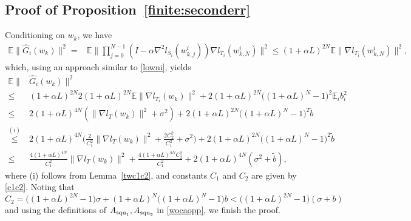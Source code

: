 \documentclass{osudissert96}
\begin{document}
\subsection*{Proof of Proposition~\ref{finite:seconderr}}
	Conditioning on $w_k$, we have 
	\begin{align*}
	\mathbb{E}\|\widehat G_i(w_k)\|^2 = &\mathbb{E} \Big\| \prod_{j=0}^{N-1}(I - \alpha \nabla^2 l_{S_i}(w_{k,j}^i))\nabla l_{T_i}(w_{k,N}^i)  \Big\|^2 \leq  (1+\alpha L)^{2N} \mathbb{E} \|\nabla l_{T_i}(w_{k,N}^i)\|^2,
	\end{align*}
	which, using an approach similar to \cref{lowni}, yields
	\begin{align}\label{gwkopo}
	\mathbb{E}\|&\widehat G_i(w_k)\|^2\nonumber
	\\ \leq&  (1+\alpha L)^{2N} 2(1+\alpha L)^{2N} \mathbb{E} \|\nabla l_{T_i}(w_k)\|^2 + 2(1+\alpha L)^{2N} \big( (1+\alpha L)^N -1\big)^2 \mathbb{E}_i b_i^2 \nonumber
	\\ \leq  & 2(1+\alpha L)^{4N} (\|\nabla l_{T}(w_k)\|^2 + \sigma^2)+ 2(1+\alpha L)^{2N} \big( (1+\alpha L)^N -1\big)^2 \widetilde b \nonumber
	\\ \overset{(i)}\leq & 2(1+\alpha L)^{4N} \Big(  \frac{2}{C_1^2} \|\nabla l_{T}(w_k)\|^2 + \frac{2C_2^2}{C_1^2} + \sigma^2 \Big) + 2(1+\alpha L)^{2N} \big( (1+\alpha L)^N -1\big)^2 \widetilde b \nonumber
	\\ \leq & \frac{4(1+\alpha L)^{4N}}{C_1^2}\|\nabla l_{T}(w_k)\|^2 + \frac{4(1+\alpha L)^{4N}C_2^2}{C_1^2} + 2(1+\alpha L)^{4N}(\sigma^2 + \widetilde b),
	\end{align}
	where (i) follows from Lemma~\ref{twc1c2}, and constants $C_1$ and $C_2$ are given by \cref{c1c2}. Noting that $C_2=\big( (1+\alpha L)^{2N}-1  \big)\sigma + (1+\alpha L)^N \big((1+\alpha L)^N -1 \big) b < \big( (1+\alpha L)^{2N}-1  \big)(\sigma +b)$ and using the definitions of $A_{\text{\normalfont squ}_1}, A_{\text{\normalfont squ}_2}$ in \cref{wocaopp}, we finish the proof. 
\end{document}

